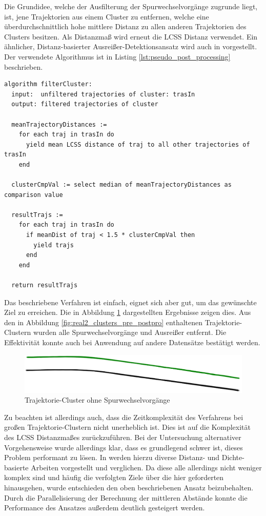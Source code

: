 Die Grundidee, welche der Ausfilterung der Spurwechselvorgänge zugrunde liegt, ist, jene Trajektorien
aus einem Cluster zu entfernen, welche eine überdurchschnittlich hohe mittlere Distanz zu allen anderen
Trajektorien des Clusters besitzen. Als Distanzmaß wird erneut die LCSS Distanz verwendet.
Ein ähnlicher, Distanz-basierter Ausreißer-Detektionsansatz wird auch in \cite[]{Mirge2017} vorgestellt.
Der verwendete Algorithmus ist in Listing \ref{lst:pseudo_post_processing} beschrieben.

\begin{lstlisting}[caption=Pseudocode Cluster Post-Processing, language=Pseudo, label=lst:pseudo_post_processing]
algorithm filterCluster:
  input:  unfiltered trajectories of cluster: trasIn
  output: filtered trajectories of cluster

  meanTrajectoryDistances :=
    for each traj in trasIn do
      yield mean LCSS distance of traj to all other trajectories of trasIn
    end

  clusterCmpVal := select median of meanTrajectoryDistances as comparison value

  resultTrajs :=
    for each traj in trasIn do
      if meanDist of traj < 1.5 * clusterCmpVal then
        yield trajs
      end
    end

  return resultTrajs
\end{lstlisting}

Das beschriebene Verfahren ist einfach, eignet sich aber gut, um das gewünschte Ziel zu erreichen.
Die in Abbildung \ref{fig:real2_clusters_post_postpro} dargestellten Ergebnisse zeigen dies.
Aus den in Abbildung \ref{fig:real2_clusters_pre_postpro} enthaltenen Trajektorie-Clustern wurden alle
Spurwechselvorgänge und Ausreißer entfernt. Die Effektivität konnte auch bei Anwendung auf andere Datensätze
bestätigt werden.

\begin{figure}[H]
    \centering
    \includegraphics[width=0.8\linewidth]{../resources/img/umsetzung/U2/Clusters_Post_Postprocessing}
    \caption{Trajektorie-Cluster ohne Spurwechselvorgänge}
    \label{fig:real2_clusters_post_postpro}
\end{figure}

Zu beachten ist allerdings auch, dass die Zeitkomplexität des Verfahrens bei großen Trajektorie-Clustern
nicht unerheblich ist. Dies ist auf die Komplexität des LCSS Distanzmaßes zurückzuführen.
Bei der Untersuchung alternativer Vorgehensweise wurde allerdings klar, dass es grundlegend schwer ist,
dieses Problem performant zu lösen. In \cite[]{Meng2018} werden hierzu diverse Distanz- und Dichte-basierte
Arbeiten vorgestellt und verglichen. Da diese alle allerdings nicht weniger komplex sind und häufig
die verfolgten Ziele über die hier geforderten hinausgehen, wurde entschieden den oben beschriebenen Ansatz
beizubehalten. Durch die Parallelisierung der Berechnung der mittleren Abstände konnte die Performance
des Ansatzes außerdem deutlich gesteigert werden.

